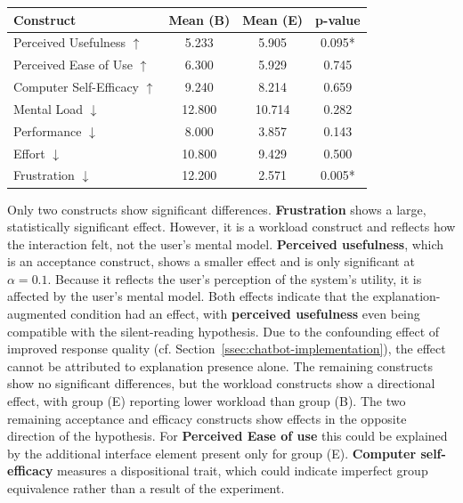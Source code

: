 \begin{ctable}
    \centering
    \begin{tabular}{l c c c}
        \toprule
        \textbf{Construct} & \textbf{Mean (B)} & \textbf{Mean (E)} & \textbf{p-value} \\
        \midrule
        Perceived Usefulness $\uparrow$   & 5.233  & 5.905  & 0.095* \\
        Perceived Ease of Use $\uparrow$  & 6.300  & 5.929  & 0.745  \\
        Computer Self-Efficacy $\uparrow$ & 9.240  & 8.214  & 0.659  \\
        Mental Load $\downarrow$          & 12.800 & 10.714 & 0.282  \\
        Performance $\downarrow$          & 8.000  & 3.857  & 0.143  \\
        Effort $\downarrow$               & 10.800 & 9.429  & 0.500  \\
        Frustration $\downarrow$          & 12.200 & 2.571  & 0.005* \\
        \bottomrule
    \end{tabular}
    \caption[Quantitative results of the study]{Quantitative comparison of group (B) and group (E). Arrows indicate the direction in which the explanation-augmented condition (group E) was hypothesised to differ in the original experiment \parencite{Goepfert2025}. Constructs marked with * are significant at $\alpha=0.1$.}
    \label{tab:quant-results-gap}
\end{ctable}

Only two constructs show significant differences. \textbf{Frustration} shows a large, statistically significant effect. However, it is a workload construct and reflects how the interaction felt, not the user's mental model. \textbf{Perceived usefulness}, which is an acceptance construct, shows a smaller effect and is only significant at $\alpha=0.1$. Because it reflects the user's perception of the system's utility, it is affected by the user's mental model. Both effects indicate that the explanation-augmented condition had an effect, with \textbf{perceived usefulness} even being compatible with the silent-reading hypothesis. Due to the confounding effect of improved response quality (cf. Section~\ref{ssec:chatbot-implementation}), the effect cannot be attributed to explanation presence alone. The remaining constructs show no significant differences, but the workload constructs show a directional effect, with group (E) reporting lower workload than group (B). The two remaining acceptance and efficacy constructs show effects in the opposite direction of the hypothesis. For \textbf{Perceived Ease of use} this could be explained by the additional interface element present only for group (E). \textbf{Computer self-efficacy} measures a dispositional trait, which could indicate imperfect group equivalence rather than a result of the experiment.

